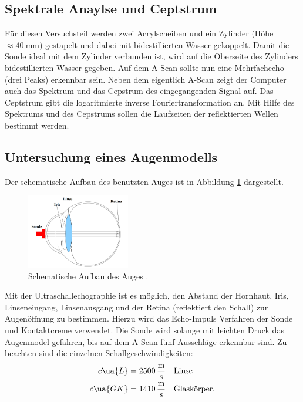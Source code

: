 \subsection{Spektrale Anaylse und Ceptstrum}

Für diesen Versuchsteil werden zwei Acrylscheiben und ein Zylinder (Höhe $\approx \SI{40}{\milli\meter}$)
gestapelt und dabei mit bidestillierten Wasser gekoppelt.
Damit die Sonde ideal mit dem Zylinder verbunden ist, wird auf die Oberseite des Zylinders
bidestillierten Wasser gegeben.
Auf dem A-Scan sollte nun eine Mehrfachecho (drei Peaks) erkennbar sein.
Neben dem eigentlich A-Scan zeigt der Computer auch das Spektrum und das Cepstrum des
eingegangenden Signal auf.
Das Ceptstrum gibt die logaritmierte inverse Fouriertransformation an.
Mit Hilfe des Spektrums und des Cepstrums sollen die Laufzeiten der reflektierten Wellen
bestimmt werden.

\subsection{Untersuchung eines Augenmodells}

Der schematische Aufbau des benutzten Auges ist in Abbildung \ref{fig: auge} dargestellt.
\begin{figure}[h]
  \centering
  \includegraphics[width=0.4\textwidth]{pics/auge.png}
  \caption{Schematische Aufbau des Auges \cite{anleitungus1}.}
  \label{fig: auge}
\end{figure}
Mit der Ultraschallechographie ist es möglich, den Abstand der Hornhaut, Iris, Linseneingang, Linsenausgang
und der Retina (reflektiert den Schall) zur Augenöffnung zu bestimmen.
Hierzu wird das Echo-Impuls Verfahren der Sonde und Kontaktcreme verwendet.
Die Sonde wird solange mit leichten Druck das Augenmodel gefahren, bis auf dem
A-Scan fünf Ausschläge erkennbar sind. Zu beachten sind die einzelnen
Schallgeschwindigkeiten:
\begin{align}
  \label{eq: schallgeschwindigkeit_auge}
  \begin{aligned}
  c\ua{L}&=\SI{2500}{\meter\per\second} & &\text{Linse} \\
  c\ua{GK}&=\SI{1410}{\meter\per\second} &  &\text{Glaskörper}.
\end{aligned}
\end{align}
